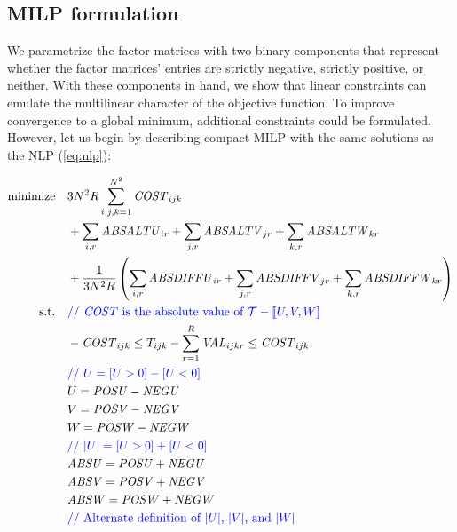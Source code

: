 \documentclass{article}
\begin{document}
\subsection{MILP formulation}

We parametrize the factor matrices with two binary components that represent whether the factor matrices' entries are strictly negative, strictly positive, or neither. With these components in hand, we show that linear constraints can emulate the multilinear character of the objective function. To improve convergence to a global minimum, additional constraints could be formulated. However, let us begin by describing compact MILP with the same solutions as the NLP (\ref{eq:nlp}):

{\footnotesize
\begin{align}
    \label{eq:milp}
    \begin{split}
    \underset{\substack{}}{\operatorname{minimize}} & \quad 3N^2R \sum_{i,j,k=1}^{N^2} \mathit{COST}_{ijk}\\
    &\quad + \sum_{i,r} \mathit{ABSALTU}_{ir} + \sum_{j,r} \mathit{ABSALTV}_{jr} + \sum_{k,r} \mathit{ABSALTW}_{kr}\\
    &\quad + \frac{1}{3N^2R}\left(\sum_{i,r} \mathit{ABSDIFFU}_{ir} + \sum_{j,r} \mathit{ABSDIFFV}_{jr} + \sum_{k,r} \mathit{ABSDIFFW}_{kr}\right)\\
    \mbox{s.t.} & \quad \mbox{\color{blue}// $\mathit{COST}$ is the absolute value of $\mathcal{T} - [\![U,V,W]\!]$} \\
    & \quad -\mathit{COST}_{ijk} \leq T_{ijk} - \sum_{r=1}^R \mathit{VAL}_{ijkr} \leq \mathit{COST}_{ijk}\\
    & \quad \mbox{\color{blue}// $U = [U > 0] - [U < 0]$} \\
    & \quad U = \mathit{POSU} - \mathit{NEGU} \\
    & \quad V = \mathit{POSV} - \mathit{NEGV} \\
    & \quad W = \mathit{POSW} - \mathit{NEGW} \\
    & \quad \mbox{\color{blue}// $|U| = [U > 0] + [U < 0]$} \\
    & \quad \mathit{ABSU} = \mathit{POSU} + \mathit{NEGU} \\
    & \quad \mathit{ABSV} = \mathit{POSV} + \mathit{NEGV} \\
    & \quad \mathit{ABSW} = \mathit{POSW} + \mathit{NEGW} \\
    & \quad \mbox{\color{blue}// Alternate definition of  $|U|$, $|V|$, and $|W|$ } \\

\end{split}
\end{align}}
\end{document}
